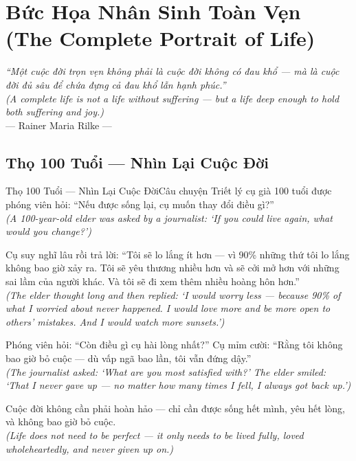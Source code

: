 \chapter{Bức Họa Nhân Sinh Toàn Vẹn (The Complete Portrait of Life)}
\begin{center}
  \textit{\color{truyengold}``Một cuộc đời trọn vẹn không phải là cuộc đời không có đau khổ --- mà là cuộc đời đủ sâu để chứa đựng cả đau khổ lẫn hạnh phúc.''}\\[4pt]
  \textit{(A complete life is not a life without suffering --- but a life deep enough to hold both suffering and joy.)}\\[4pt]
  \small\color{truyenblue}--- Rainer Maria Rilke ---
\end{center}
\ngancach

\section{Thọ 100 Tuổi --- Nhìn Lại Cuộc Đời}
\begin{truyen}{Thọ 100 Tuổi --- Nhìn Lại Cuộc Đời}{Câu chuyện Triết lý}
 cụ già 100 tuổi được phóng viên hỏi: ``Nếu được sống lại, cụ muốn thay đổi điều gì?''\\[4pt]
\textit{(A 100-year-old elder was asked by a journalist: `If you could live again, what would you change?')}

Cụ suy nghĩ lâu rồi trả lời: ``Tôi sẽ lo lắng ít hơn --- vì 90\% những thứ tôi lo lắng không bao giờ xảy ra. Tôi sẽ yêu thương nhiều hơn và sẽ cởi mở hơn với những sai lầm của người khác. Và tôi sẽ đi xem thêm nhiều hoàng hôn hơn.''\\[4pt]
\textit{(The elder thought long and then replied: `I would worry less --- because 90\% of what I worried about never happened. I would love more and be more open to others' mistakes. And I would watch more sunsets.')}

Phóng viên hỏi: ``Còn điều gì cụ hài lòng nhất?'' Cụ mỉm cười: ``Rằng tôi không bao giờ bỏ cuộc --- dù vấp ngã bao lần, tôi vẫn đứng dậy.''\\[4pt]
\textit{(The journalist asked: `What are you most satisfied with?' The elder smiled: `That I never gave up --- no matter how many times I fell, I always got back up.')}

\end{truyen}
\begin{baihoc}
  Cuộc đời không cần phải hoàn hảo --- chỉ cần được sống hết mình, yêu hết lòng, và không bao giờ bỏ cuộc.\\[4pt]
  \textit{(Life does not need to be perfect --- it only needs to be lived fully, loved wholeheartedly, and never given up on.)}
\end{baihoc}

